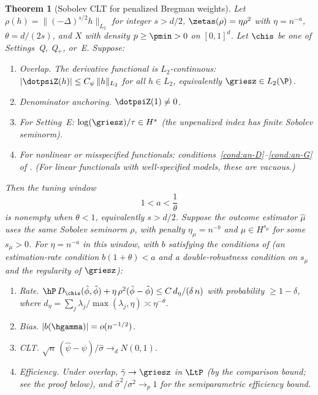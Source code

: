 \documentclass{article}
\newtheorem{theorem}{Theorem}[section]
\begin{document}
\begin{theorem}[Sobolev CLT for penalized Bregman weights]
\label{thm:sobolev-clt}
Let $\rho(h) = \|(-\Delta)^{s/2} h\|_{L_2}$
for integer $s > d/2$,
$\zetas(\rho) = \eta\rho^2$
with $\eta = n^{-a}$,
$\theta = d/(2s)$,
and $X$ with density $p \ge \pmin > 0$
on $[0,1]^d$.
Let $\chis$ be one of
Settings~Q, Q$_+$, or~E.
Suppose:
\begin{enumerate}[label=\textup{(\Alph*)}]
\item\label{cond:sob-overlap}
\textit{Overlap.}
The derivative functional is $L_2$-continuous:
$|\dotpsiZ(h)| \le C_\psi\,\|h\|_{L_2}$
for all $h \in L_2$,
equivalently $\griesz \in L_2(\P)$.
\item\label{cond:sob-denom}
\textit{Denominator anchoring.}
$\dotpsiZ(1) \neq 0$.
\item\label{cond:sob-dispersion}
For Setting~E:
$\log(\griesz)/\tau \in H^s$
(the unpenalized index has finite Sobolev seminorm).
\item\label{cond:sob-misc}
For nonlinear or misspecified functionals:
conditions~\ref{cond:an-D}--\ref{cond:an-G}
of .
(For linear functionals with well-specified models,
these are vacuous.)
\end{enumerate}

Then the tuning window
\begin{equation}\label{eq:sobolev-clt-window}
1 < a < \frac{1}{\theta}
\end{equation}
is nonempty when $\theta < 1$,
equivalently $s > d/2$.
Suppose the outcome estimator $\hat\mu$
uses the same Sobolev seminorm $\rho$,
with penalty $\eta_\mu = n^{-b}$
and $\mu \in H^{s_\mu}$ for some $s_\mu > 0$.
For $\eta = n^{-a}$
in this window,
with $b$ satisfying the conditions
of 
(an estimation-rate condition
$b(1+\theta) < a$
and a double-robustness condition
on $s_\mu$ and the regularity of $\griesz$):
\begin{enumerate}[label=\textup{(\roman*)}]
\item \textit{Rate.}
$\hP\,D_{\chis}(\hat\phi, \tilde\phi)
  + \eta\,\rho^2(\hat\phi - \tilde\phi)
  \le C\,d_\eta / (\delta\,n)$
with probability $\ge 1 - \delta$,
where $d_\eta = \sum_j \lambda_j/\max(\lambda_j, \eta)
  \asymp \eta^{-\theta}$.
\item \textit{Bias.}
$|b(\hgamma)| = o(n^{-1/2})$.
\item \textit{CLT.}
$\sqrt{n}\,(\hat\psi - \psi)/\hat\sigma
  \to_d N(0,1)$.
\item \textit{Efficiency.}
Under overlap,
$\tilde\gamma \to \griesz$ in $\LtP$
(by the comparison bound;
see the proof below),
and $\hat\sigma^2/\sigma^2 \to_p 1$
for the semiparametric efficiency bound.
\end{enumerate}
\end{theorem}
\end{document}
